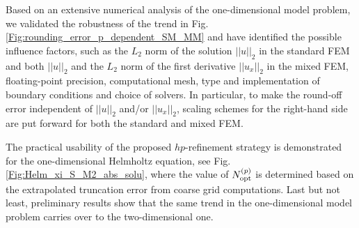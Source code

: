 \documentclass[a4paper]{article}
\begin{document}
Based on an extensive numerical analysis of the one-dimensional model problem\cite{LiuMH2018apractical}, we validated the robustness of the trend in Fig. \ref{Fig:rounding_error_p_dependent_SM_MM} and have identified the possible influence factors, such as the $L_2$ norm of the solution $||u||_2$ in the standard FEM and both $||u||_2$ and the $L_2$ norm of the first derivative $||u_x||_2$ in the mixed FEM, floating-point precision, computational mesh, type and implementation of boundary conditions and choice of solvers. In particular, to make the round-off error independent of $||u||_2$ and/or $||u_x||_2$, scaling schemes for the right-hand side are put forward for both the standard and mixed FEM. 

The practical usability of the proposed $hp$-refinement strategy is demonstrated for the one-dimensional Helmholtz equation\cite{LiuMH2018apractical}, see Fig. \ref{Fig:Helm_xi_S_M2_abs_solu}, where the value of $N_{\rm opt} ^{(p)}$ is determined based on the extrapolated truncation error from coarse grid computations.
Last but not least, preliminary results show that the same trend in the one-dimensional model problem carries over to the two-dimensional one.



\end{document}

